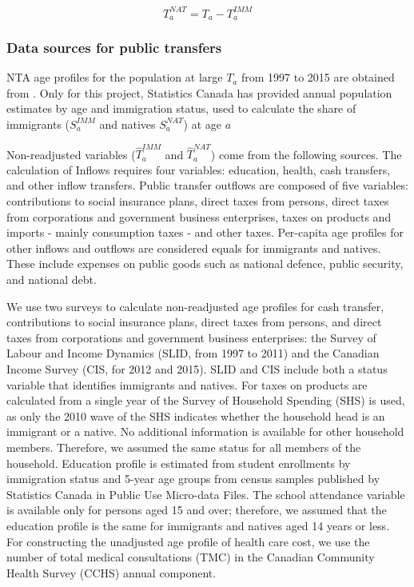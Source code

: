 \begin{equation}\label{eq:nat}
 {T}^{NAT}_a ={T}_a -{T}^{IMM}_a
\end{equation}

\subsubsection*{Data sources for public transfers}
NTA age profiles for the population at large \({T}_a \) from 1997 to 2015 are obtained from  \citet{Merette:2019kz}.
Only for this project, Statistics Canada has provided annual population estimates by age and immigration status, used to calculate the share of immigrants (\( S^{IMM}_a \) and natives \( S^{NAT}_a \)) at age \(a \)

Non-readjusted variables (\(\hat{T}^{IMM}_a \) and \(\hat{T}^{NAT}_a \)) come from the following sources.
The calculation of Inflows requires four variables: education, health, cash transfers, and other inflow transfers.
Public transfer outflows are composed of five variables: contributions to social insurance plans, direct taxes from persons, direct taxes from corporations and government business enterprises, taxes on products and imports - mainly consumption taxes - and other taxes.
Per-capita age profiles for other inflows and outflows are considered equals for immigrants and natives. These include expenses on public goods such as national defence, public security, and national debt.

\vspace{0.7em}\par
We use two surveys to calculate non-readjusted age profiles for cash transfer, contributions to social insurance plans, direct taxes from persons, and direct taxes from corporations and government business enterprises: the Survey of Labour and Income Dynamics (SLID, from 1997 to 2011) and the Canadian Income Survey (CIS, for 2012 and 2015).
SLID and CIS include both a status variable that identifies immigrants and natives.
For taxes on products are calculated from a single year of the Survey of Household Spending (SHS) is used, as only the 2010 wave of the SHS indicates whether the household head is an immigrant or a native.
No additional information is available for other household members.
Therefore, we assumed the same status for all members of the household.
Education profile is estimated from student enrollments by immigration status and 5-year age groups from census samples published by Statistics Canada in Public Use Micro-data Files. The school attendance variable is available only for persons aged 15 and over; therefore, we assumed that the education profile is the same for immigrants and natives aged 14 years or less.
For constructing the unadjusted age profile of health care cost, we use the number of total medical consultations (TMC) in the Canadian Community Health Survey (CCHS) annual component.

